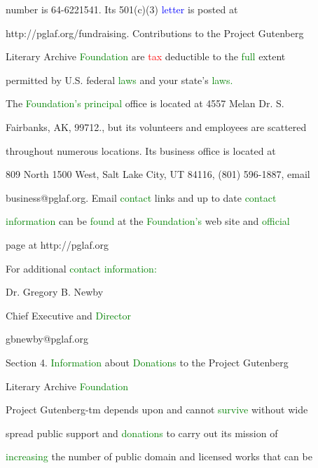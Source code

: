  number is 64-6221541. Its 501(c)(3) \textcolor{blue}{letter} is posted at

 http://pglaf.org/fundraising. Contributions to the Project Gutenberg

 Literary Archive \textcolor{green}{Foundation} are \textcolor{red}{tax} deductible to the \textcolor{green}{full} extent

 permitted by U.S. federal \textcolor{green}{laws} and your state's \textcolor{green}{laws.}



 The \textcolor{green}{Foundation's} \textcolor{green}{principal} office is located at 4557 Melan Dr. S.

 Fairbanks, AK, 99712., but its \textcolor{BurntOrange}{volunteers} and employees are scattered

 throughout numerous locations. Its business office is located at

 809 North 1500 West, Salt Lake City, UT 84116, (801) 596-1887, email

 business@pglaf.org. Email \textcolor{green}{contact} links and up to date \textcolor{green}{contact}

 \textcolor{green}{information} can be \textcolor{green}{found} at the \textcolor{green}{Foundation's} web site and \textcolor{green}{official}

 page at http://pglaf.org



 For additional \textcolor{green}{contact} \textcolor{green}{information:}

 Dr. Gregory B. Newby

 Chief Executive and \textcolor{green}{Director}

 gbnewby@pglaf.org





 Section 4. \textcolor{green}{Information} about \textcolor{green}{Donations} to the Project Gutenberg

 Literary Archive \textcolor{green}{Foundation}



 Project Gutenberg-tm depends upon and cannot \textcolor{green}{survive} without wide

 spread \textcolor{BurntOrange}{public} support and \textcolor{green}{donations} to carry out its mission of

 \textcolor{green}{increasing} the number of \textcolor{BurntOrange}{public} domain and licensed works that can be

